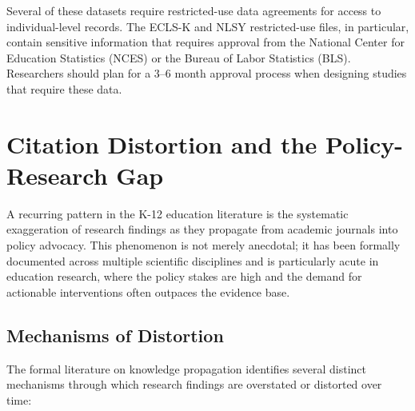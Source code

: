 \documentclass[12pt,letterpaper]{article}
\begin{document}
Several of these datasets require restricted-use data agreements for access to individual-level records. The ECLS-K and NLSY restricted-use files, in particular, contain sensitive information that requires approval from the National Center for Education Statistics (NCES) or the Bureau of Labor Statistics (BLS). Researchers should plan for a 3--6 month approval process when designing studies that require these data.


\section{Citation Distortion and the Policy-Research Gap}

A recurring pattern in the K-12 education literature is the systematic exaggeration of research findings as they propagate from academic journals into policy advocacy. This phenomenon is not merely anecdotal; it has been formally documented across multiple scientific disciplines and is particularly acute in education research, where the policy stakes are high and the demand for actionable interventions often outpaces the evidence base.

\subsection{Mechanisms of Distortion}

The formal literature on knowledge propagation identifies several distinct mechanisms through which research findings are overstated or distorted over time:
\end{document}
